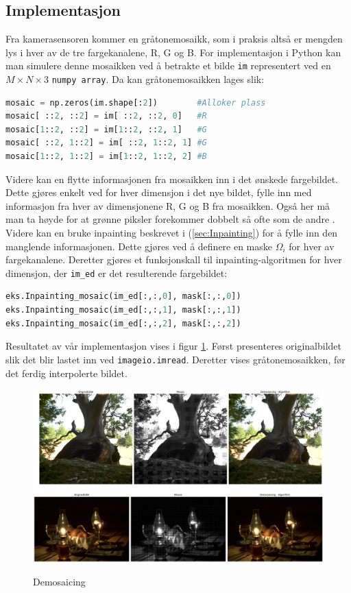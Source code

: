 \subsection{Implementasjon}
Fra kamerasensoren kommer en gråtonemosaikk, som i praksis altså er mengden lys i hver av de tre fargekanalene, R, G og B. For implementasjon i Python kan man simulere denne mosaikken ved å betrakte et bilde \texttt{im} representert ved en $M\times N \times 3$ \texttt{numpy array}. Da kan gråtonemosaikken lages slik:
\begin{lstlisting}[language=Python]
mosaic = np.zeros(im.shape[:2])        #Alloker plass
mosaic[ ::2, ::2] = im[ ::2, ::2, 0]   #R 
mosaic[1::2, ::2] = im[1::2, ::2, 1]   #G
mosaic[ ::2, 1::2] = im[ ::2, 1::2, 1] #G
mosaic[1::2, 1::2] = im[1::2, 1::2, 2] #B
\end{lstlisting}
\newpage
Videre kan en flytte informasjonen fra mosaikken inn i det ønskede fargebildet. Dette gjøres enkelt ved for hver dimensjon i det nye bildet, fylle inn med informasjon fra hver av dimensjonene R, G og B fra mosaikken. Også her må man ta høyde for at grønne piksler forekommer dobbelt så ofte som de andre \cite{Demosaic38:online}. Videre kan en bruke inpainting beskrevet i (\ref{sec:Inpainting}) for å fylle inn den manglende informasjonen. Dette gjøres ved å definere en maske $\Omega_i$ for hver av fargekanalene. Deretter gjøres et funksjonskall til inpainting-algoritmen for hver dimensjon, der \texttt{im\_ed} er det resulterende fargebildet:
\begin{lstlisting}[language=Python]
eks.Inpainting_mosaic(im_ed[:,:,0], mask[:,:,0])
eks.Inpainting_mosaic(im_ed[:,:,1], mask[:,:,1])
eks.Inpainting_mosaic(im_ed[:,:,2], mask[:,:,2])
\end{lstlisting}
Resultatet av vår implementasjon vises i figur \ref{Figur 5}. Først presenteres originalbildet slik det blir lastet inn ved \texttt{imageio.imread}. Deretter vises gråtonemosaikken, før det ferdig interpolerte bildet. 
\\[1cm]
\begin{figure}[H]
\begin{center}
    \includegraphics[width=1\columnwidth]{bilder/Demosaicing/tree_mosaic.png} 
    \includegraphics[width=1\columnwidth]{bilder/Demosaicing/stillLife_mosaic.png}
    \caption{Demosaicing \label{Figur 5}}
\end{center}
\end{figure}
